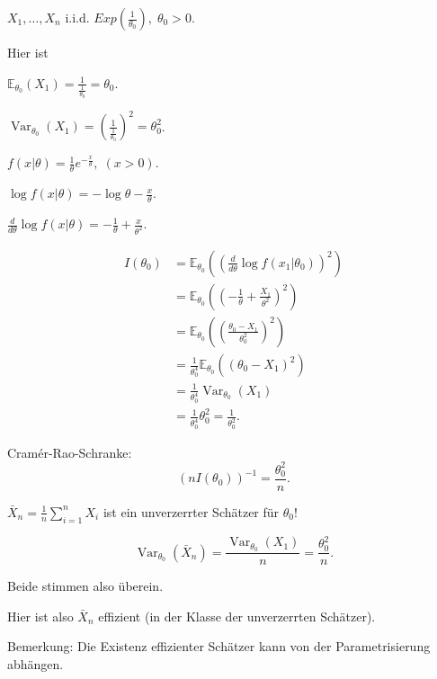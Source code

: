 \documentclass{tstextbook}
\DeclareMathOperator{\Var}{Var}
\newcommand{\E}{\mathbb E}
\begin{document}
\begin{example}
	$ X_1,\ldots,X_n $ i.i.d. $ Exp\left(\frac{1}{\theta_0}\right), \; \theta_0 > 0 $. 
	
	Hier ist
	
	$ \E_{\theta_0}(X_1) = \frac{1}{\frac{1}{\theta_0}} = \theta_0 $.
	
	$ \Var_{\theta_0} (X_1)  = \left(\frac{1}{\frac{1}{\theta_0}}\right)^2 = \theta_0^2 $.
	
	$ f(x|\theta) = \frac{1}{\theta} e^{-\frac{x}{\theta}}, \; (x > 0) $. 
	
	$ \log f(x|\theta) = -\log \theta -  \frac{x}{\theta} $. 
	
	$ \frac{d}{d\theta} \log f(x|\theta) = -\frac{1}{\theta} + \frac{x}{\theta^2} $. 
	
	\[
	\begin{aligned}
		I(\theta_0) & = \E_{\theta_0} \left(\left(\frac{d}{d\theta}\log f(x_1|\theta_0)\right)^2\right) \\
		& = \E_{\theta_0} \left(\left(-\frac{1}{\theta} + \frac{X_1}{\theta^2}\right)^2\right) \\
		& = \E_{\theta_0} \left(\left(\frac{\theta_0-X_1}{\theta_0^2}\right)^2\right) \\
		& = \frac{1}{\theta_0^4}\E_{\theta_0} \left(\left(\theta_0-X_1\right)^2\right) \\
		& =\frac{1}{\theta_0^4} \Var_{\theta_0}(X_1) \\
		& = \frac{1}{\theta_0^4}\theta_0^2  = \frac{1}{\theta_0^2}.
	\end{aligned}
	\]
	
	Cramér-Rao-Schranke: 
	\[
	(nI(\theta_0))^{-1} = \frac{\theta_0^2}{n}.
	\]
	
	$ \bar{X}_n = \frac{1}{n}\sum_{i=1}^{n}X_i $ ist ein unverzerrter Schätzer für $ \theta_0 $!
	
	\[
	\Var_{\theta_0}(\bar{X}_n) = \frac{\Var_{\theta_0}(X_1)}{n} = \frac{\theta_0^2}{n}.
	\]
	
	Beide stimmen also überein. 
	
	Hier ist also $ \bar{X}_n $ effizient (in der Klasse der unverzerrten Schätzer). 
\end{example}

\begin{remark}
	Bemerkung: Die Existenz effizienter Schätzer kann von der Parametrisierung abhängen.
\end{remark}
\end{document}

